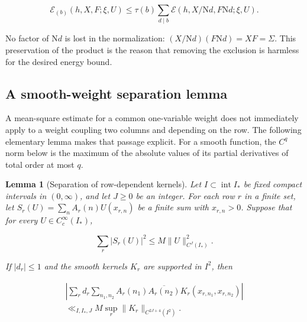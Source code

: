 \documentclass[reqno,a4paper,11pt]{amsart}
\newtheorem{lemma}{Lemma}[section]
\begin{document}
\begin{equation}\label{eq:26}
\mathcal{E}_{(b)}(h,X,F;\xi,U)\le\tau(b)\sum_{d\mid b}\mathcal{E}(h,X/\mathrm{N}d,F\mathrm{N}d;\xi,U).
\end{equation}

No factor of $\mathrm{N}d$ is lost in the normalization: $(X/\mathrm{N}d)(F\mathrm{N}d)=XF=\Sigma$. This preservation of the product is the reason that removing the exclusion is harmless for the desired energy bound.

\subsection*{A smooth-weight separation lemma}

A mean-square estimate for a common one-variable weight does not immediately apply to a weight coupling two columns and depending on the row. The following elementary lemma makes that passage explicit. For a smooth function, the $C^q$ norm below is the maximum of the absolute values of its partial derivatives of total order at most $q$.

\begin{lemma}[Separation of row-dependent kernels]

Let $I\subset\operatorname{int}I_*$ be fixed compact intervals in $(0,\infty)$, and let $J\ge0$ be an integer. For each row $r$ in a finite set, let $S_r(U)=\sum_n A_r(n)U(x_{r,n})$ be a finite sum with $x_{r,n}>0$. Suppose that for every $U\in C_c^\infty(I_*)$,

\begin{equation}\label{eq:kernel-hypothesis}
\sum_r|S_r(U)|^2\le M\|U\|_{C^J(I_*)}^2.
\end{equation}

If $|d_r|\le1$ and the smooth kernels $K_r$ are supported in $I^2$, then

\begin{equation}\label{eq:kernel-conclusion}
\begin{gathered}
\left|\sum_r d_r\sum_{n_1,n_2}A_r(n_1)\overline{A_r(n_2)}K_r(x_{r,n_1},x_{r,n_2})\right| \\ \ll_{I,I_*,J}M\sup_r\|K_r\|_{C^{2J+4}(I^2)}.
\end{gathered}
\end{equation}

\end{lemma}
\end{document}
